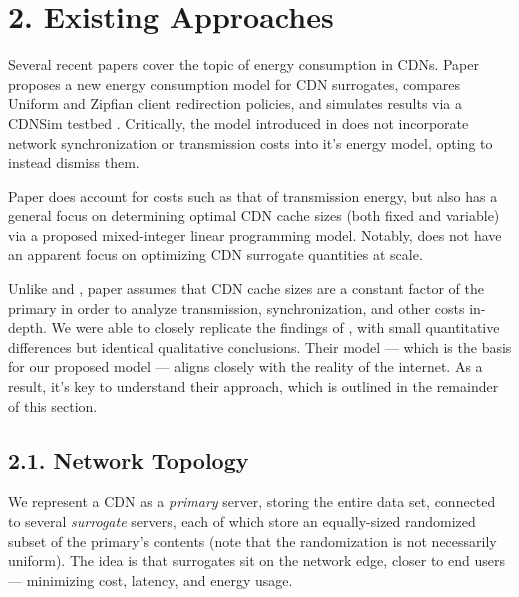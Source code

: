 \documentclass[
	a4paper, %
	10pt, %
	unnumberedsections, %
	twoside, %
]{LTJournalArticle}
\begin{document}

\section{2. Existing Approaches}

Several recent papers cover the topic of energy consumption in CDNs. Paper \cite{ulIslam2012} proposes a new energy consumption model for CDN surrogates, compares Uniform and Zipfian client redirection policies, and simulates results via a CDNSim testbed \cite{cdnsim}. Critically, the model introduced in \cite{ulIslam2012} does not incorporate network synchronization or transmission costs into it's energy model, opting to instead dismiss them. 

Paper \cite{osmanthesis} does account for costs such as that of transmission energy, but also has a general focus on determining optimal CDN cache sizes (both fixed and variable) via a proposed mixed-integer linear programming model. Notably, \cite{osmanthesis} does not have an apparent focus on optimizing CDN surrogate quantities at scale.

Unlike \cite{osmanthesis} and \cite{ulIslam2012}, paper \cite{biancoCDNs2017} assumes that CDN cache sizes are a constant factor of the primary in order to analyze transmission, synchronization, and other costs in-depth. We were able to closely replicate the findings of \cite{biancoCDNs2017}, with small quantitative differences but identical qualitative conclusions. Their model — which is the basis for our proposed model — aligns closely with the reality of the internet. As a result, it's key to understand their approach, which is outlined in the remainder of this section.

\subsection{2.1. Network Topology}

We represent a CDN as a \textit{primary} server, storing the entire data set, connected to several \textit{surrogate} servers, each of which store an equally-sized randomized subset of the primary's contents (note that the randomization is not necessarily uniform). The idea is that surrogates sit on the network edge, closer to end users — minimizing cost, latency, and energy usage. 
\end{document}
